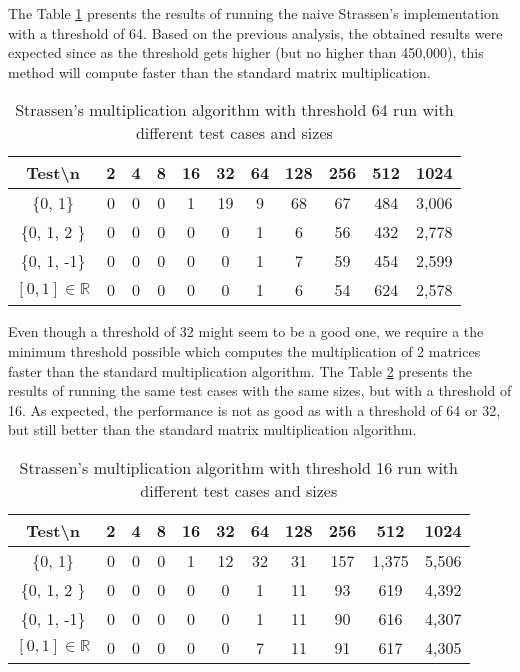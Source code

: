 \documentclass[tikz, 12pt]{scrartcl}
\begin{document}
The Table \ref{strassen64} presents the results of running the naive Strassen's implementation with a threshold of 64. Based on the previous analysis, the obtained results were expected since as the threshold gets higher (but no higher than 450,000), this method will compute faster than the standard matrix multiplication. 

\begin{table}[h!]
\caption{Strassen's multiplication algorithm with threshold 64 run with different test cases and sizes\label{strassen64}}
\centering
\begin{tabular}{|c|cccccccccc|}
\hline
Test\textbackslash  n		&	2	&	4	&	8	&	16	&	32	&	64	&	128		&	256		&	512		&	1024\\
\hline
\{0, 1\}				&	0	&	0	&	0	&	1	&	19	&	9	&	68		&	67		&	484		&	3,006\\
\{0, 1, 2 \}				&	0	&	0	&	0	&	0	&	0	&	1	&	6		&	56		&	432		&	2,778\\
\{0, 1, -1\}				&	0	&	0	&	0	&	0	&	0	&	1	&	7		&	59		&	454		&	2,599\\
$[0, 1] \in \mathbb{R}$	&	0	&	0	&	0	&	0	&	0	&	1	&	6		&	54		&	624		&	2,578\\
\hline
\end{tabular}
\end{table}

Even though a threshold of 32 might seem to be a good one, we require a the minimum threshold possible which computes the multiplication of 2 matrices faster than the standard multiplication algorithm. The Table \ref{strassen16} presents the results of running the same test cases with the same sizes, but with a threshold of 16. As expected, the performance is not as good as with a threshold of 64 or 32, but still better than the standard matrix multiplication algorithm.

\begin{table}[h!]
\caption{Strassen's multiplication algorithm with threshold 16 run with different test cases and sizes\label{strassen16}}
\centering
\begin{tabular}{|c|cccccccccc|}
\hline
Test\textbackslash  n		&	2	&	4	&	8	&	16	&	32	&	64	&	128		&	256		&	512		&	1024\\
\hline
\{0, 1\}				&	0	&	0	&	0	&	1	&	12	&	32	&	31		&	157		&	1,375	&	5,506\\
\{0, 1, 2 \}				&	0	&	0	&	0	&	0	&	0	&	1	&	11		&	93		&	619		&	4,392\\
\{0, 1, -1\}				&	0	&	0	&	0	&	0	&	0	&	1	&	11		&	90		&	616		&	4,307\\
$[0, 1] \in \mathbb{R}$	&	0	&	0	&	0	&	0	&	0	&	7	&	11		&	91		&	617		&	4,305\\
\hline
\end{tabular}
\end{table}
\end{document}
